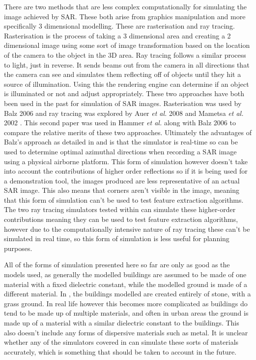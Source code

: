 There are two methods that are less complex computationally for simulating the image achieved by SAR. These both arise from graphics manipulation and more specifically 3 dimensional modelling. These are rasterisation and ray tracing. Rasterisation is the process of taking a 3 dimensional area and creating a 2 dimensional image using some sort of image transformation based on the location of the camera to the object in the 3D area. Ray tracing follows a similar process to light, just in reverse. It sends beams out from the camera in all directions that the camera can see and simulates them reflecting off of objects until they hit a source of illumination. Using this the rendering engine can determine if an object is illuminated or not and adjust appropriately. These two approaches have both been used in the past for simulation of SAR images. Rasterisation was used by Balz 2006 \cite{balzRealtimeSARSimulation2006} and ray tracing was explored by Auer \textit{et al.} 2008 \cite{auerRayTracingSimulating2008} and Mametsa \textit{et al.} 2002 \cite{mametsaImagingRadarSimulation2002}. This second paper was used in Hammer \textit{et al.} \cite{hammerComparisonSARSimulation2008} along with Balz 2006 to compare the relative merits of these two approaches. Ultimately the advantages of Balz's approach as detailed in \cite{balzImprovedRealTimeSAR2006} and \cite{balzRealtimeSARSimulation2006} is that the simulator is real-time so can be used to determine optimal azimuthal directions when recording a SAR image using a physical airborne platform. This form of simulation however doesn't take into account the contributions of higher order reflections so if it is being used for a demonstration tool, the images produced are less representative of an actual SAR image. This also means that corners aren't visible in the image, meaning that this form of simulation can't be used to test feature extraction algorithms. The two ray tracing simulators tested within \cite{hammerComparisonSARSimulation2008} can simulate these higher-order contributions meaning they can be used to test feature extraction algorithms, however due to the computationally intensive nature of ray tracing these can't be simulated in real time, so this form of simulation is less useful for planning purposes. \par
All of the forms of simulation presented here so far are only as good as the models used, as generally the modelled buildings are assumed to be made of one material with a fixed dielectric constant, while the modelled ground is made of a different material. In \cite{hammerComparisonSARSimulation2008}, the buildings modelled are created entirely of stone, with a grass ground. In real life however this becomes more complicated as buildings do tend to be made up of multiple materials, and often in urban areas the ground is made up of a material with a similar dielectric constant to the buildings. This also doesn't include any forms of dispersive materials such as metal. It is unclear whether any of the simulators covered in \cite{hammerComparisonSARSimulation2008} can simulate these sorts of materials accurately, which is something that should be taken to account in the future. \par
